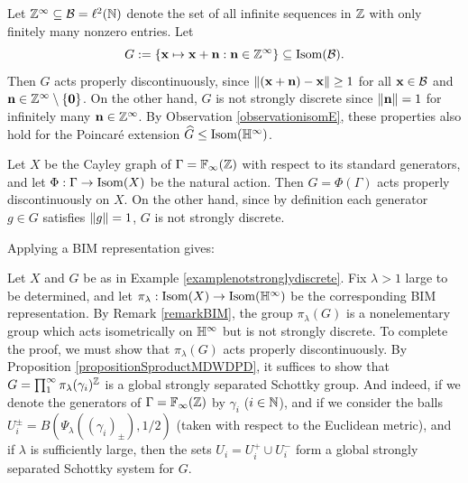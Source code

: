 \begin{example}
\label{exampletranslations}
Let $\Z^\infty\subset\BB = \ell^2(\N)$ denote the set of all infinite sequences in $\Z$ with only finitely many nonzero entries. Let
\[
G := \{ \xx \mapsto \xx + \nn : \nn\in\Z^\infty \} \subset \Isom(\BB).
\]
Then $G$ acts properly discontinuously, since $\|(\mathbf x + \mathbf n) - \mathbf x\| \geq 1$ for all $\mathbf x\in\mathcal B$ and $\nn\in\Z^\infty\butnot\{\0\}$. On the other hand, $G$ is not strongly discrete since $\|\mathbf n\| = 1$ for infinitely many $\nn\in\Z^\infty$. By Observation \ref{observationisomE}, these properties also hold for the Poincar\'e extension $\what G\leq\Isom(\H^\infty)$.
\end{example}

\begin{example}
\label{examplenotstronglydiscrete}
Let $X$ be the Cayley graph of $\Gamma = \F_\infty(\Z)$ with respect to its standard generators, and let $\Phi:\Gamma\to\operatorname{Isom}(X)$ be the natural action. Then $G = \Phi(\Gamma)$ acts properly discontinuously on $X$. On the other hand, since by definition each generator $g\in G$ satisfies $\|g\| = 1$, $G$ is not strongly discrete.
\end{example}

Applying a BIM representation gives:

\begin{example}
\label{examplenotstronglydiscreteBIM}
Let $X$ and $G$ be as in Example \ref{examplenotstronglydiscrete}. Fix $\lambda > 1$ large to be determined, and let $\pi_\lambda:\Isom(X)\to \Isom(\H^\infty)$ be the corresponding BIM representation. By Remark \ref{remarkBIM}, the group $\pi_\lambda(G)$ is a nonelementary group which acts isometrically on $\H^\infty$ but is not strongly discrete. To complete the proof, we must show that $\pi_\lambda(G)$ acts properly discontinuously. By Proposition \ref{propositionSproductMDWDPD}, it suffices to show that $G = \prod_1^\infty \pi_\lambda(\gamma_i)^\Z$ is a global strongly separated Schottky group. And indeed, if we denote the generators of $\Gamma = \F_\infty(\Z)$ by $\gamma_i$ ($i\in\N$), and if we consider the balls $U_i^\pm = B(\Psi_\lambda((\gamma_i)_\pm),1/2)$ (taken with respect to the Euclidean metric), and if $\lambda$ is sufficiently large, then the sets $U_i = U_i^+\cup U_i^-$ form a global strongly separated Schottky system for $G$.
\end{example}

